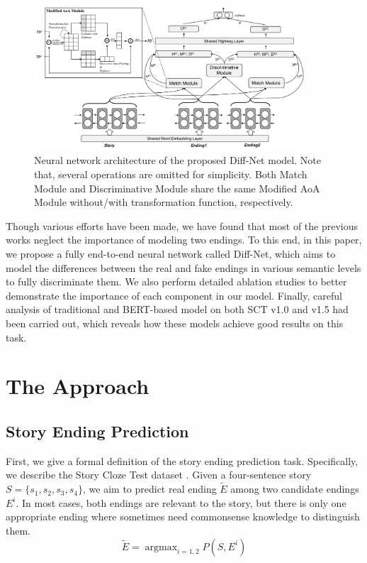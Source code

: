 \documentclass[letterpaper]{article} %
\begin{document}
\begin{figure}[htbp]
  \centering
  \includegraphics[width=0.9\textwidth]{model.pdf}
  \caption{\label{nn-arch} Neural network architecture of the proposed Diff-Net model. Note that, several operations are omitted for simplicity. Both Match Module and Discriminative Module share the same Modified AoA Module without/with transformation function, respectively.}
\end{figure}

Though various efforts have been made, we have found that most of the previous works neglect the importance of modeling two endings.
To this end, in this paper, we propose a fully end-to-end neural network called Diff-Net, which aims to model the differences between the real and fake endings in various semantic levels to fully discriminate them. 
We also perform detailed ablation studies to better demonstrate the importance of each component in our model.
Finally, careful analysis of traditional and BERT-based model on both SCT v1.0 and v1.5 had been carried out, which reveals how these models achieve good results on this task.



\section{The Approach}\label{diffnet}
\subsection{Story Ending Prediction}
First, we give a formal definition of the story ending prediction task.
Specifically, we describe the Story Cloze Test dataset \cite{mostafazadeh-etal-2016}.
Given a four-sentence story $S=\{s_1, s_2, s_3, s_4\}$, we aim to predict real ending $\widetilde{E}$ among two candidate endings $E^i$.
In most cases, both endings are relevant to the story, but there is only one appropriate ending where sometimes need commonsense knowledge to distinguish them.
\begin{equation}
\widetilde{E} = \mathop{\arg\max}_{i=1,2}P(S, E^i)
\end{equation}
\end{document}
